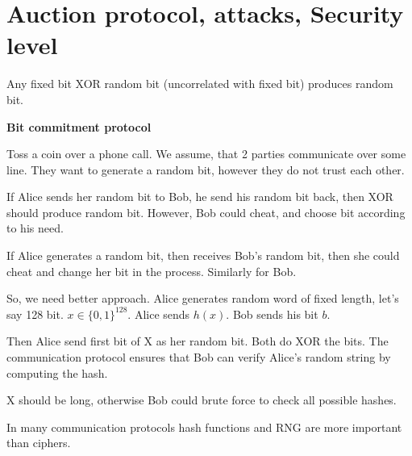 \section{\texorpdfstring{Auction protocol, attacks, Security level}{Auction protocol, attacks, Security level}}
\vspace{5mm}
\large
\begin{observation}\label{random_bit}
	Any fixed bit XOR random bit (uncorrelated with fixed bit) produces random bit.
\end{observation}

\begin{example}
	\textbf{Bit commitment protocol}

	Toss a coin over a phone call. We assume, that 2 parties communicate over some line.
	They want to generate a random bit, however they do not trust each other.

	If Alice sends her random bit to Bob, he send his random bit back, then XOR should produce random bit. However, Bob could cheat, and choose bit according to his need.

	If Alice generates a random bit, then receives Bob's random bit, then she could cheat and change her bit in the process. Similarly for Bob.

	So, we need better approach. Alice generates random word of fixed length, let's say 128 bit. $x \in \{ 0, 1 \} ^{128}$. Alice sends $h(x)$. Bob sends his bit $b$.

	Then Alice send first bit of X as her random bit. Both do XOR the bits.
	The communication protocol ensures that Bob can verify Alice's random string by computing the hash.

	X should be long, otherwise Bob could brute force to check all possible hashes.
\end{example}

\begin{observation}
	In many communication protocols hash functions and RNG are more important than ciphers.
\end{observation}

